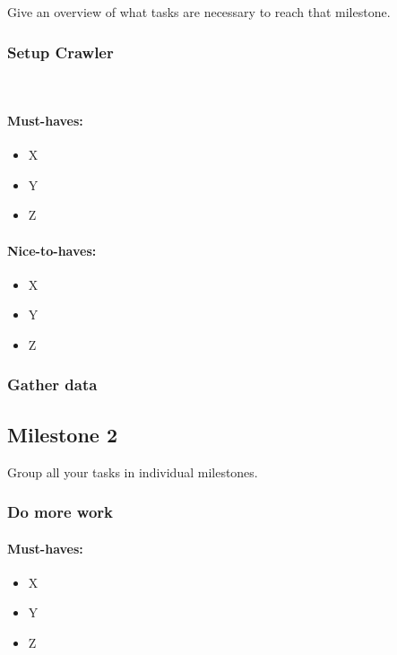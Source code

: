 \documentclass[expose, en]{thesis}
\begin{document}
Give an overview of what tasks are necessary to reach that milestone.

\subsubsection{Setup Crawler}
\label{sec:task1}
\lipsum[1]\\

\paragraph{Must-haves:}
\begin{itemize}
    \item X
    \item Y
    \item Z
\end{itemize}

\paragraph{Nice-to-haves:}
\begin{itemize}
    \item X
    \item Y
    \item Z
\end{itemize}

\subsubsection{Gather data}
\label{sec:task2}
\lipsum[1]

\subsection{Milestone 2}

Group all your tasks in individual milestones.

\subsubsection{Do more work}
\label{sec:task3}
\lipsum[1]

\paragraph{Must-haves:}
\begin{itemize}
    \item X
    \item Y
    \item Z
\end{itemize}
\end{document}
